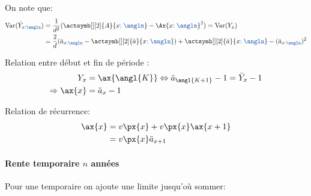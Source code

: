 \documentclass[10pt, french]{article}
\begin{document}
\begin{multicols*}{3}
On note que:
\begin{align*}
	\text{Var}(\ddot{Y}_{x\textcolor{cobalt}{:\angln}})
	&=	\frac{1}{d^{2}}(\actsymb[][2]{A}{x\textcolor{cobalt}{:\angln}} - \Ax{x\textcolor{cobalt}{:\angln}}^{2})
	=	\text{Var}(Y_{x})	\\
	&=	\frac{2}{d}(\ddot{a}_{x\textcolor{cobalt}{:\angln}} - \actsymb[][2]{\ddot{a}}{x\textcolor{cobalt}{:\angln}}) + \actsymb[][2]{\ddot{a}}{x\textcolor{cobalt}{:\angln}} - (\ddot{a}_{x\textcolor{cobalt}{:\angln}})^{2}
\end{align*}

Relation entre début et fin de période :
\begin{align*}
	Y_{x}	
	&=	\ax{\angl{K}}	
	\Leftrightarrow	\ddot{a}_{\angl{K + 1}} - 1 
	=	\ddot{Y}_{x} - 1 	\\
	\Rightarrow \ax{x} 
	&= \ddot{a}_{x} - 1
\end{align*}

Relation de récurrence:
\begin{align*}
	\ax{x} 
	&= v \px{x}	+	v \px{x}	 \ax{x + 1}	\\
	&= v \px{x}\ddot{a}_{x + 1}	
\end{align*}

\paragraph{Rente temporaire $n$ années}

Pour une temporaire on ajoute une limite jusqu'où sommer:\\


\end{multicols*}
\end{document}

